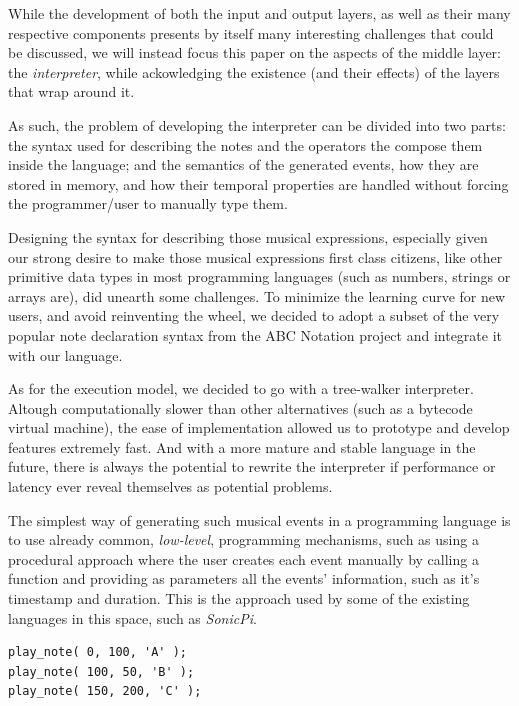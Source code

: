 \documentclass[a4paper,UKenglish,cleveref, autoref]{oasics-v2019}
\begin{document}
While the development of both the input and output layers, as well as their many respective components presents by itself many interesting challenges that could be discussed, we will instead focus this paper on the aspects of the middle layer: the \textit{interpreter}, while ackowledging the existence (and their effects) of the layers that wrap around it.

As such, the problem of developing the interpreter can be divided into two parts: the syntax used for describing the notes and the operators the compose them inside the language; and the semantics of the generated events, how they are stored in memory, and how their temporal properties are handled without forcing the programmer/user to manually type them. 

Designing the syntax for describing those musical expressions, especially given our strong desire to make those musical expressions first class citizens, like other primitive data types in most programming languages (such as numbers, strings or arrays are), did unearth some challenges. To minimize the learning curve for new users, and avoid reinventing the wheel, we decided to adopt a subset of the very popular note declaration syntax from the ABC Notation project\cite{AbcNotation} and integrate it with our language.

As for the execution model, we decided to go with a tree-walker interpreter\cite{CraftingInterpreters}. Altough computationally slower than other alternatives (such as a bytecode virtual machine), the ease of implementation allowed us to prototype and develop features extremely fast. And with a more mature and stable language in the future, there is always the potential to rewrite the interpreter if performance or latency ever reveal themselves as potential problems.


The simplest way of generating such musical events in a programming language is to use already common, \textit{low-level}, programming mechanisms, such as using a procedural approach where the user creates each event manually by calling a function and providing as parameters all the events' information, such as it's timestamp and duration. This is the approach used by some of the existing languages in this space, such as \textit{SonicPi}.

\begin{lstlisting}[caption={Example of a hypothetical imperative API for creating events},label=list:1,captionpos=t,abovecaptionskip=-\medskipamount]
play_note( 0, 100, 'A' );
play_note( 100, 50, 'B' );
play_note( 150, 200, 'C' );
\end{lstlisting}
\end{document}
